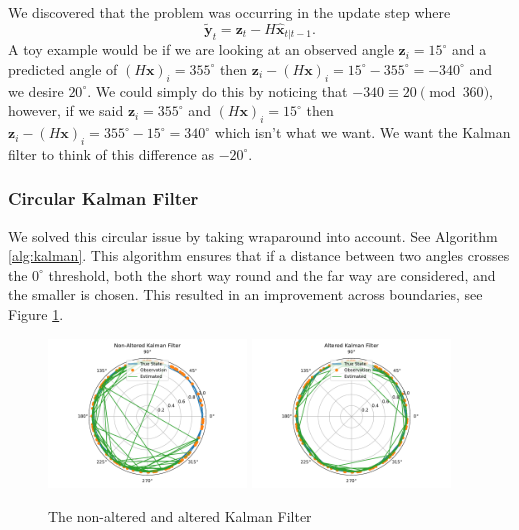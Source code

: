 \documentclass[11pt]{amsart}
\begin{document}
We discovered that the problem was occurring in the update step where \[\mathbf{\tilde{y}}_t = \mathbf{z}_t - H\mathbf{\hat{x}}_{t|t-1}.\]
A toy example would be if we are looking at an observed angle $\mathbf{z}_i = 15^{\circ}$ and a predicted angle of $(H\mathbf{x})_i = 355^{\circ}$ 
then $\mathbf{z}_i - (H\mathbf{x})_i = 15^{\circ} - 355^{\circ} = -340^{\circ}$ and we desire $20^{\circ}$. We could simply do this by noticing that $-340 \equiv 20 \pmod {360}$,
however, if we said $\mathbf{z}_i=355^{\circ}$ and $(H\mathbf{x})_i = 15^{\circ}$ then $\mathbf{z}_i - (H\mathbf{x})_i = 355^{\circ} - 15^{\circ} = 340^{\circ}$ which isn't what we want.
We want the Kalman filter to think of this difference as $-20^{\circ}$.
\subsubsection{Circular Kalman Filter}
We solved this circular issue by taking\newline
wraparound into account. See Algorithm \ref{alg:kalman}. This algorithm ensures that if a distance
between two angles crosses the $0^{\circ}$ threshold, both the short way round and the far way are
considered, and the smaller is chosen. This resulted in an improvement across boundaries, see
Figure \ref{fig:simple_kalman}.

\begin{figure}[htp]
    \centering
    \includegraphics[width=0.47\textwidth]{non_altered_kalman.pdf}\hfill
    \includegraphics[width=0.47\textwidth]{altered_kalman.pdf}\hfill
    \caption{The non-altered and altered Kalman Filter}
    \label{fig:simple_kalman}
\end{figure}
\end{document}
